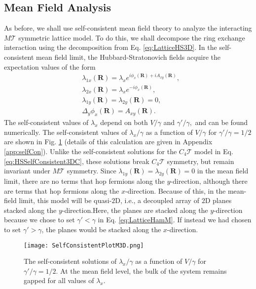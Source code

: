 \documentclass[prb,aps,twocolumn,groupaddress,floatfix]{revtex4-1}
\begin{document}
\subsection{Mean Field Analysis}\label{ssec:MFM}
As before, we shall use self-consistent mean field theory to analyze the interacting $M\mathcal{T}$ symmetric lattice model. To do this, we shall decompose the ring exchange interaction using the decomposition from Eq. \ref{eq:LatticeHS3D}. 
In the self-consistent mean field limit, the Hubbard-Stratonovich fields acquire the expectation values of the form
\begin{equation}
\begin{split}
&\lambda_{1x}(\bm{R}) = \lambda_x e^{i\phi_x(\bm{R}) + i A_{xy}(\bm{R})},\\
&\lambda_{2x}(\bm{R})  = \lambda_x e^{-i \phi_x(\bm{R})},\\
& \lambda_{1y}(\bm{R})=\lambda_{2y}(\bm{R})=0,\\
 &\Delta_y\phi_x(\bm{R}) = A_{xy}(\bm{R}).
\end{split}\label{eq:HSSolutionsM3D}
\end{equation}
The self-consistent values of $\lambda_x$ depend on both $V/\gamma$ and $\gamma'/\gamma,$ and can be found numerically. The self-consistent values of $\lambda_x/\gamma$ as a function of $V/\gamma$ for $\gamma'/\gamma  = 1/2$ are shown in Fig. \ref{fig:SelfConsistentPlotM} (details of this calculation are given in Appendix \ref{app:selfCon}). Unlike the self-consistent solutions for the $C_4\mathcal{T}$ model in Eq. \ref{eq:HSSelfConsistent3DC}, these solutions break $C_4 \mathcal{T}$ symmetry, but remain invariant under $M\mathcal{T}$ symmetry. Since $\lambda_{1y}(\bm{R})=\lambda_{2y}(\bm{R})=0$ in the mean field limit, there are no terms that hop fermions along the $y$-direction, although there are terms that hop fermions along the $x$-direction. Because of this, in the mean-field limit, this model will be quasi-$2$D, i.e., a decoupled array of $2$D planes stacked along the $y$-direction.Here, the planes are stacked along the $y$-direction because we chose to set $\gamma'<\gamma$ in Eq. \ref{eq:LatticeHamM}. If instead we had chosen to set $\gamma'>\gamma$, the planes would be stacked along the $x$-direction.





\begin{figure}
\texttt{[image: SelfConsistentPlotM3D.png]}
\caption{The self-consistent solutions of $\lambda_x/\gamma$ as a function of $V/\gamma$ for $\gamma'/\gamma = 1/2$. At the mean field level, the bulk of the system remains gapped for all values of  $\lambda_x$. }
\label{fig:SelfConsistentPlotM}
\end{figure}
\end{document}
